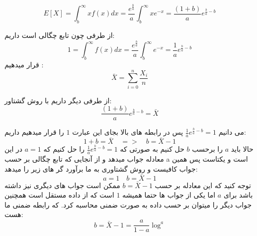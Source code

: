 \problem{}
\[
  E[X] = \int_{b}^{\infty}{xf(x)dx} = 
  \frac{e^{\frac{b}{a}}}{a}\int_{b}^{\infty}{xe^{-x}} =
  \frac{(1+b)}{a}e^{\frac{b}{a}-b}
\]

از طرفی چون تابع چگالی است داریم:\\
\[
  1 = \int_{b}^{\infty}{f(x)dx} = 
  \frac{e^{\frac{b}{a}}}{a}\int_{b}^{\infty}{e^{-x}} =
  \frac{1}{a}e^{\frac{b}{a}-b}
\]
قرار میدهیم :\\
\[
    \bar{X} = \sum_{i = 0}^{n}{\frac{X_i}{n}}    
\]

 از طرفی دیگر داریم با روش گشتاور:\\
 \[
    \frac{(1+b)}{a}e^{\frac{b}{a}-b}  = \bar{X}
 \]

 می دانیم $\frac{1}{a}e^{\frac{b}{a}-b} = 1$
 پس در رابطه های بالا بجای این عبارت $1$ را قرار میدهیم داریم:\\
 \[
    1+b = \bar{X} \quad => \quad b = \bar{X} - 1
 \]
حالا باید $a$ را برحسب $b$ حل کنیم به صورتی که 
$\frac{1}{a}e^{\frac{b}{a}-b} = 1$
را حل کنیم که $a = 1$
در این معادله جواب میدهد و از آنجایی که تابع چگالی بر حسب a است و یکتاست
پس همین جواب کافیست و روش گشتاوری به ما برآورد گر های زیر را میدهد:\\
\[
    a = 1 \quad b = \bar{X} - 1
\]
توجه کنید که این معادله بر حسب $b = \bar{X} - 1$
 ممکن است جواب های دیگری نیز داشته باشد برای $a$
 اما یکی از جواب ها حتما همیشه $1$
 است که از داده مستقل است همچنین جواب دیگر را میتوان بر حسب داده به صورت ضمنی محاسبه کرد.
 که رابطه ضمنی ما هست:\\
 \[
    b = \bar{X} - 1 =\frac{a}{1-a}\log^{a}
 \]















